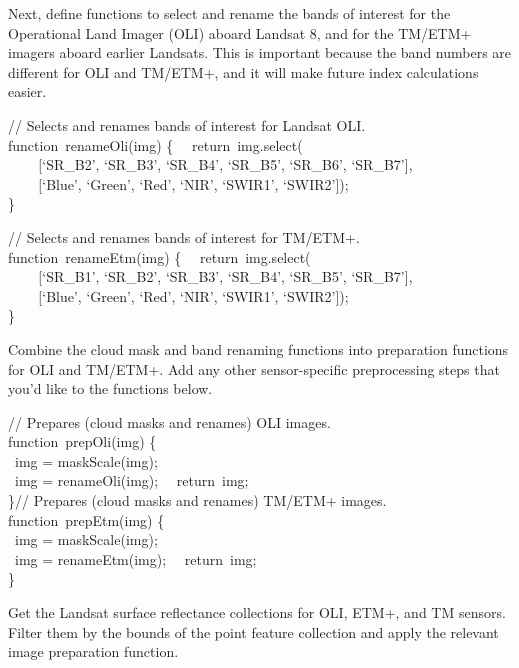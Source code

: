 \documentclass[
  letterpaper,
  DIV=11,
  numbers=noendperiod]{scrreprt}
\begin{document}
Next, define functions to select and rename the bands of interest for
the Operational Land Imager (OLI) aboard Landsat 8, and for the TM/ETM+
imagers aboard earlier Landsats. This is important because the band
numbers are different for OLI and TM/ETM+, and it will make future index
calculations easier.

// Selects and renames bands of interest for Landsat OLI.\\
function~renameOli(img) \{~ ~return~img.select(\\
\hspace*{0.333em} ~ ~ ~{[}`SR\_B2', `SR\_B3', `SR\_B4', `SR\_B5',
`SR\_B6', `SR\_B7'{]},\\
\hspace*{0.333em} ~ ~ ~{[}`Blue', `Green', `Red', `NIR', `SWIR1',
`SWIR2'{]});\\
\}

// Selects and renames bands of interest for TM/ETM+.\\
function~renameEtm(img) \{~ ~return~img.select(\\
\hspace*{0.333em} ~ ~ ~{[}`SR\_B1', `SR\_B2', `SR\_B3', `SR\_B4',
`SR\_B5', `SR\_B7'{]},\\
\hspace*{0.333em} ~ ~ ~{[}`Blue', `Green', `Red', `NIR', `SWIR1',
`SWIR2'{]});\\
\}

Combine the cloud mask and band renaming functions into preparation
functions for OLI and TM/ETM+. Add any other sensor-specific
preprocessing steps that you'd like to the functions below.

// Prepares (cloud masks and renames) OLI images.\\
function~prepOli(img) \{\\
\hspace*{0.333em} ~img = maskScale(img);\\
\hspace*{0.333em} ~img = renameOli(img);~ ~return~img;\\
\}// Prepares (cloud masks and renames) TM/ETM+ images.\\
function~prepEtm(img) \{\\
\hspace*{0.333em} ~img = maskScale(img);\\
\hspace*{0.333em} ~img = renameEtm(img);~ ~return~img;\\
\}

Get the Landsat surface reflectance collections for OLI, ETM+, and TM
sensors. Filter them by the bounds of the point feature collection and
apply the relevant image preparation function.
\end{document}
